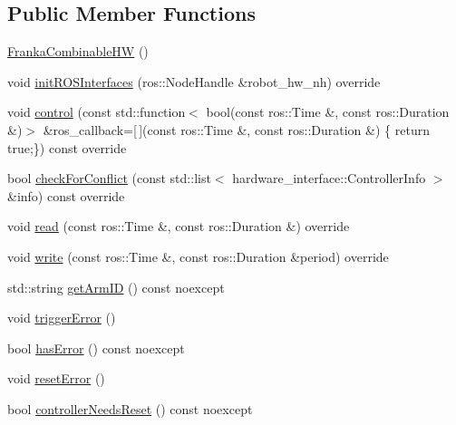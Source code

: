 \subsection*{Public Member Functions}
\begin{DoxyCompactItemize}
\item 
\hyperlink{classfranka__hw_1_1_franka_combinable_h_w_aac256f1d5ce4757f146c468cb841153a}{Franka\+Combinable\+HW} ()
\item 
void \hyperlink{classfranka__hw_1_1_franka_combinable_h_w_a1e89406fc542ad7fb45ff0c1402c61c3}{init\+R\+O\+S\+Interfaces} (ros\+::\+Node\+Handle \&robot\+\_\+hw\+\_\+nh) override
\item 
void \hyperlink{classfranka__hw_1_1_franka_combinable_h_w_a07855d935d7063930be9aa140d0895f8}{control} (const std\+::function$<$ bool(const ros\+::\+Time \&, const ros\+::\+Duration \&)$>$ \&ros\+\_\+callback=\mbox{[}$\,$\mbox{]}(const ros\+::\+Time \&, const ros\+::\+Duration \&) \{ return true;\}) const override
\item 
bool \hyperlink{classfranka__hw_1_1_franka_combinable_h_w_aa2a84c1da5161ddb38e33f112c8850a7}{check\+For\+Conflict} (const std\+::list$<$ hardware\+\_\+interface\+::\+Controller\+Info $>$ \&info) const override
\item 
void \hyperlink{classfranka__hw_1_1_franka_combinable_h_w_a44e3093eb876aef71423c4f5142c7ed8}{read} (const ros\+::\+Time \&, const ros\+::\+Duration \&) override
\item 
void \hyperlink{classfranka__hw_1_1_franka_combinable_h_w_ab96f9d6af06fbd7569d8a059d1bfbdd4}{write} (const ros\+::\+Time \&, const ros\+::\+Duration \&period) override
\item 
std\+::string \hyperlink{classfranka__hw_1_1_franka_combinable_h_w_a31d0a4ffa87fc3a480707cb8ea813fcc}{get\+Arm\+ID} () const noexcept
\item 
void \hyperlink{classfranka__hw_1_1_franka_combinable_h_w_a48c2df229bf691b9e760dd6b557fb5ef}{trigger\+Error} ()
\item 
bool \hyperlink{classfranka__hw_1_1_franka_combinable_h_w_a1698d87cf7f2312301f43366a1f13cc2}{has\+Error} () const noexcept
\item 
void \hyperlink{classfranka__hw_1_1_franka_combinable_h_w_a1699fa199d607af6f70000ebe6796da8}{reset\+Error} ()
\item 
bool \hyperlink{classfranka__hw_1_1_franka_combinable_h_w_aa5b8428ab18cdfe26154fe3b10447562}{controller\+Needs\+Reset} () const noexcept
\end{DoxyCompactItemize}
